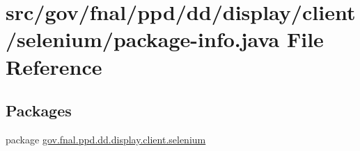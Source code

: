 \hypertarget{gov_2fnal_2ppd_2dd_2display_2client_2selenium_2package-info_8java}{\section{src/gov/fnal/ppd/dd/display/client/selenium/package-\/info.java File Reference}
\label{gov_2fnal_2ppd_2dd_2display_2client_2selenium_2package-info_8java}
}
\subsection*{Packages}
\begin{DoxyCompactItemize}
\item 
package \hyperlink{namespacegov_1_1fnal_1_1ppd_1_1dd_1_1display_1_1client_1_1selenium}{gov.\-fnal.\-ppd.\-dd.\-display.\-client.\-selenium}
\end{DoxyCompactItemize}
